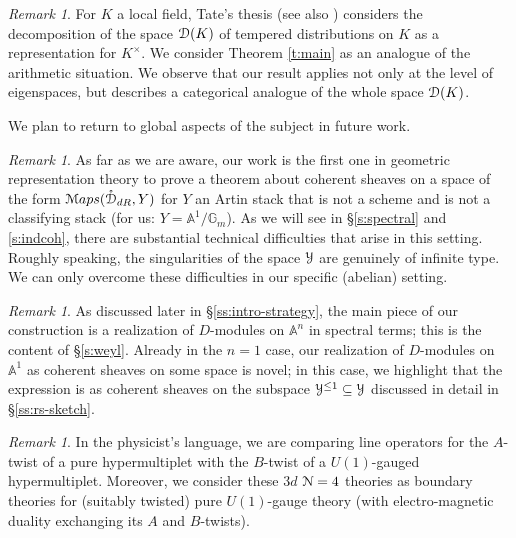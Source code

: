 \documentclass[reqno,11pt]{amsart}
\numberwithin{equation}{subsection}
\theoremstyle{remark}
\newtheorem{rem}[thm]{Remark}
\newcommand{\bA}{{\mathbb A}}
\newcommand{\bG}{{\mathbb G}}
\newcommand{\sD}{{\EuScript D}}
\newcommand{\sM}{{\EuScript M}}
\newcommand{\sN}{{\EuScript N}}
\newcommand{\sY}{{\EuScript Y}}
\newcommand{\Maps}{\sM aps}
\renewcommand{\o}[1]{\mathring{#1}}
\renewcommand{\subset}{\subseteq}
\begin{document}
\begin{rem}

For $K$ a local field, Tate's thesis \cite{tate-thesis} 
(see also \cite{tate-thesis-weil}) 
considers the decomposition of the space
$\sD(K)$ of tempered distributions on $K$ 
as a representation for $K^{\times}$. We consider Theorem \ref{t:main} 
as an analogue of the arithmetic situation. We observe that
our result applies not only at the level of eigenspaces, 
but describes a categorical analogue of the whole space $\sD(K)$.

We plan to return to global aspects of the subject in future work. 


\end{rem}

\begin{rem}

As far as we are aware, our work is the first one in geometric representation
theory to prove a theorem about coherent sheaves on a 
space of the form $\Maps(\o{\sD}_{dR},Y)$ for $Y$ an Artin stack
that is not a scheme and is not a classifying stack (for us: $Y = \bA^1/\bG_m$). 
As we will see in \S \ref{s:spectral} and \ref{s:indcoh}, there are substantial
technical difficulties that arise in this setting.
Roughly speaking, the singularities of the space $\sY$ are genuinely of infinite type. 
We can only overcome these difficulties in our specific (abelian) setting.

\end{rem}

\begin{rem}

As discussed later in \S \ref{ss:intro-strategy}, the main piece of our
construction is a realization of $D$-modules on $\bA^n$ in spectral terms;
this is the content of \S \ref{s:weyl}.
Already in the $n = 1$ case, our realization of $D$-modules on 
$\bA^1$ as coherent sheaves on some space is novel; in this case, 
we highlight that the expression
is as coherent sheaves on the subspace $\sY^{\leq 1} \subset \sY$ 
discussed in detail in  \S \ref{ss:rs-sketch}.

\end{rem}

\begin{rem}

In the physicist's language, we are 
comparing line operators for the $A$-twist of a pure hypermultiplet
with the $B$-twist of a $U(1)$-gauged hypermultiplet. Moreover, we
consider these $3d$ $\sN = 4$ theories as boundary theories for 
(suitably twisted) pure $U(1)$-gauge theory (with electro-magnetic duality
exchanging its $A$ and $B$-twists).

\end{rem}
\end{document}
